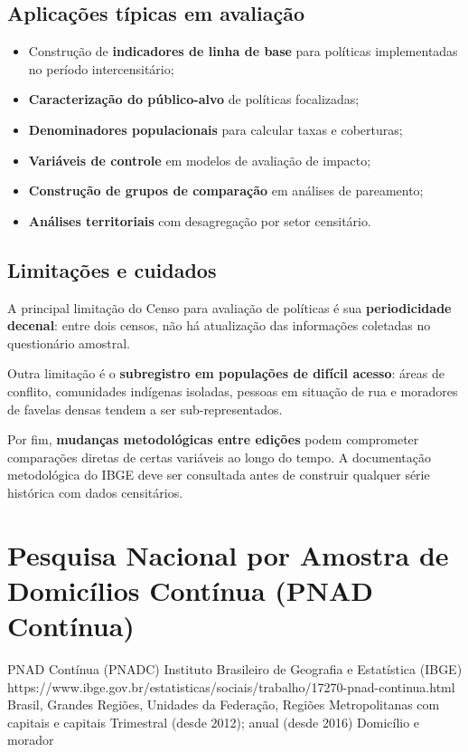 \subsection{Aplicações típicas em avaliação}

\begin{itemize}
  \item Construção de \textbf{indicadores de linha de base} para políticas implementadas no período intercensitário;
  \item \textbf{Caracterização do público-alvo} de políticas focalizadas;
  \item \textbf{Denominadores populacionais} para calcular taxas e coberturas;
  \item \textbf{Variáveis de controle} em modelos de avaliação de impacto;
  \item \textbf{Construção de grupos de comparação} em análises de pareamento;
  \item \textbf{Análises territoriais} com desagregação por setor censitário.
\end{itemize}

\subsection{Limitações e cuidados}

A principal limitação do Censo para avaliação de políticas é sua \textbf{periodicidade decenal}: entre dois censos, não há atualização das informações coletadas no questionário amostral.

Outra limitação é o \textbf{subregistro em populações de difícil acesso}: áreas de conflito, comunidades indígenas isoladas, pessoas em situação de rua e moradores de favelas densas tendem a ser sub-representados.

Por fim, \textbf{mudanças metodológicas entre edições} podem comprometer comparações diretas de certas variáveis ao longo do tempo. A documentação metodológica do IBGE deve ser consultada antes de construir qualquer série histórica com dados censitários.

\section{Pesquisa Nacional por Amostra de Domicílios Contínua
         (PNAD Contínua)}

\ficharapida
  {PNAD Contínua (PNADC)}
  {Instituto Brasileiro de Geografia e Estatística (IBGE)}
  {https://www.ibge.gov.br/estatisticas/sociais/trabalho/17270-pnad-continua.html}
  {Brasil, Grandes Regiões, Unidades da Federação, Regiões Metropolitanas com capitais e capitais}
  {Trimestral (desde 2012); anual (desde 2016)}
  {Domicílio e morador}

